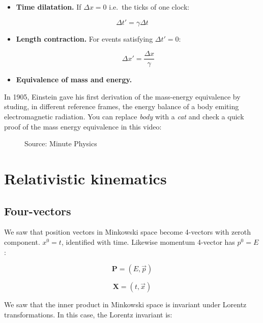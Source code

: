 \documentclass[
  letterpaper,
  DIV=11,
  numbers=noendperiod]{scrreprt}
\providecommand{\tightlist}{%
  \setlength{\itemsep}{0pt}\setlength{\parskip}{0pt}}\usepackage{longtable,booktabs,array}
\begin{document}
\begin{itemize}
\tightlist
\item
  \textbf{Time dilatation.} If \(\Delta x = 0\) i.e.~the ticks of one
  clock:
\end{itemize}

\[\Delta t' = \gamma \Delta t\]

\begin{itemize}
\item
  \textbf{Length contraction.} For events satisfying \(\Delta t' = 0\):

  \[\Delta x' = \frac{\Delta x}{\gamma}\]
\item
  \textbf{Equivalence of mass and energy.}
\end{itemize}

In 1905, Einstein gave his first derivation of the mass-energy
equivalence by studing, in different reference frames, the energy
balance of a body emiting electromagnetic radiation. You can replace
\emph{body} with a \emph{cat} and check a quick proof of the mass energy
equivalence in this video:

\begin{figure}


\caption{\label{fig-minute}Source: Minute Physics}

\end{figure}%

\section{Relativistic kinematics}\label{relativistic-kinematics}

\subsection{Four-vectors}\label{four-vectors}

We saw that position vectors in Minkowski space become 4-vectors with
zeroth component. \(x^0 = t\), identified with time. Likewise momentum
4-vector has \(p^0 = E\):

\[ {\mathbf P} = (E, \vec{p})\]

\[ {\mathbf X} = (t, \vec{x})\]

We saw that the inner product in Minkowski space is invariant under
Lorentz transformations. In this case, the Lorentz invariant is:
\end{document}
